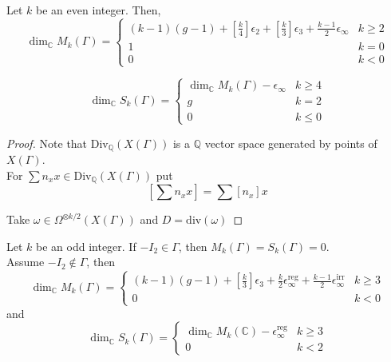 \documentclass[oneside, 12pt]{scrbook}
\newcommand{\CC}{\mathbb C}
\newcommand{\QQ}{\mathbb Q}
\theoremstyle{theorem}
\begin{document}
\begin{theorem}
Let $k$ be an even integer. Then, 
\begin{equation}
\dim_{\CC} M_{k}(\Gamma) = \begin{cases} (k-1)(g-1) + \left[ \frac{k}{4} \right] \epsilon_{2} + \left[ \frac{k}{3} \right] \epsilon_{3} + \frac{k-1}{2} \epsilon_{\infty} & k \geq 2 \\ 1 & k=0 \\ 0 & k<0 \end{cases}
\end{equation}

\begin{equation}
\dim_{\CC}S_{k}(\Gamma) = \begin{cases} \dim_{\CC} M_{k}(\Gamma) - \epsilon_{\infty}  & k \geq 4 \\ g & k =2 \\ 0 & k \le 0 \end{cases}
\end{equation}
\end{theorem}

\begin{proof}
Note that $\mathrm{Div}_{\QQ}(X(\Gamma))$ is a $\QQ$ vector space generated by points of $X(\Gamma)$. \\

For $\sum n_{x} x \in \mathrm{Div}_{\QQ}(X(\Gamma))$ put 
\begin{equation}
\left[ \sum n_{x} x \right]  = \sum [n_{x}]x
\end{equation}

Take $\omega \in \Omega^{\otimes k/2} (X(\Gamma))$ and $D = \mathrm{div}(\omega)$
\end{proof}

\begin{theorem}
Let $k$ be an odd integer. If $-I_{2} \in \Gamma$, then $M_{k}(\Gamma) = S_{k}(\Gamma)=0$. \\

Assume $-I_{2} \not \in \Gamma$, then 
\begin{equation}
\dim_{\CC} M_{k}(\Gamma) = \begin{cases} (k-1)(g-1) + \left[ \frac{k}{3} \right] \epsilon_{3} + \frac{k}{2} \epsilon_{\infty}^{\mathrm{reg}} + \frac{k-1}{2} \epsilon_{\infty}^{\mathrm{irr}} & k \geq 3 \\ 0 & k<0 \end{cases}
\end{equation} 
and 
\begin{equation}
\dim_{\CC}S_{k}(\Gamma) = \begin{cases} \dim_{\CC} M_{k}(\CC) - \epsilon^{\mathrm{reg}}_{\infty}  & k \geq 3 \\ 0 & k <2  \end{cases}
\end{equation}
\end{theorem}
\end{document}
